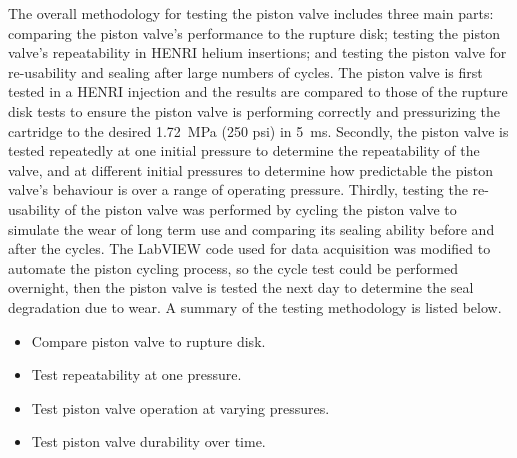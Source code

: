 The overall methodology for testing the piston valve includes three main parts: comparing the piston valve's performance to the rupture disk; testing the piston valve's repeatability in HENRI helium insertions; and testing the piston valve for re-usability and sealing after large numbers of cycles. The piston valve is first tested in a HENRI injection and the results are compared to those of the rupture disk tests to ensure the piston valve is performing correctly and pressurizing the cartridge to the desired \SI{1.72}{\mega\pascal} (250 psi) in \SI{5}{\milli\second}. Secondly, the piston valve is tested repeatedly at one initial pressure to determine the repeatability of the valve, and at different initial pressures to determine how predictable the piston valve's behaviour is over a range of operating pressure. Thirdly, testing the re-usability of the piston valve was performed by cycling the piston valve to simulate the wear of long term use and comparing its sealing ability before and after the cycles. The LabVIEW code used for data acquisition was modified to automate the piston cycling process, so the cycle test could be performed overnight, then the piston valve is tested the next day to determine the seal degradation due to wear. A summary of the testing methodology is listed below.

\begin{itemize}
    \item Compare piston valve to rupture disk.
    \item Test repeatability at one pressure.
    \item Test piston valve operation at varying pressures.
    \item Test piston valve durability over time.
\end{itemize}